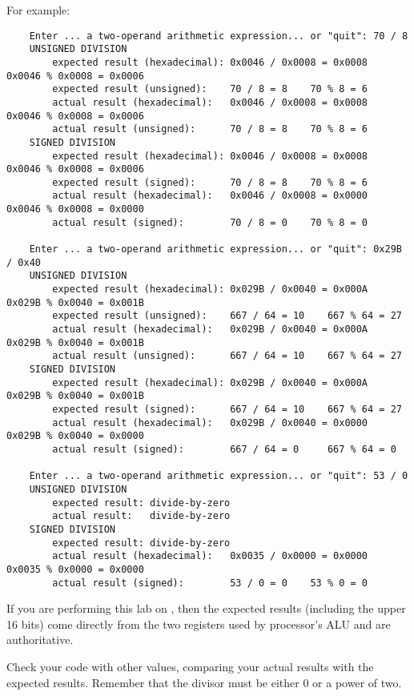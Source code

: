 For example:
\begin{small}\begin{verbatim}
    Enter ... a two-operand arithmetic expression... or "quit": 70 / 8
    UNSIGNED DIVISION
        expected result (hexadecimal): 0x0046 / 0x0008 = 0x0008    0x0046 % 0x0008 = 0x0006
        expected result (unsigned):    70 / 8 = 8    70 % 8 = 6
        actual result (hexadecimal):   0x0046 / 0x0008 = 0x0008    0x0046 % 0x0008 = 0x0006
        actual result (unsigned):      70 / 8 = 8    70 % 8 = 6
    SIGNED DIVISION
        expected result (hexadecimal): 0x0046 / 0x0008 = 0x0008    0x0046 % 0x0008 = 0x0006
        expected result (signed):      70 / 8 = 8    70 % 8 = 6
        actual result (hexadecimal):   0x0046 / 0x0008 = 0x0000    0x0046 % 0x0008 = 0x0000
        actual result (signed):        70 / 8 = 0    70 % 8 = 0

    Enter ... a two-operand arithmetic expression... or "quit": 0x29B / 0x40
    UNSIGNED DIVISION
        expected result (hexadecimal): 0x029B / 0x0040 = 0x000A    0x029B % 0x0040 = 0x001B
        expected result (unsigned):    667 / 64 = 10    667 % 64 = 27
        actual result (hexadecimal):   0x029B / 0x0040 = 0x000A    0x029B % 0x0040 = 0x001B
        actual result (unsigned):      667 / 64 = 10    667 % 64 = 27
    SIGNED DIVISION
        expected result (hexadecimal): 0x029B / 0x0040 = 0x000A    0x029B % 0x0040 = 0x001B
        expected result (signed):      667 / 64 = 10    667 % 64 = 27
        actual result (hexadecimal):   0x029B / 0x0040 = 0x0000    0x029B % 0x0040 = 0x0000
        actual result (signed):        667 / 64 = 0     667 % 64 = 0

    Enter ... a two-operand arithmetic expression... or "quit": 53 / 0
    UNSIGNED DIVISION
        expected result: divide-by-zero
        actual result:   divide-by-zero
    SIGNED DIVISION
        expected result: divide-by-zero
        actual result (hexadecimal):   0x0035 / 0x0000 = 0x0000    0x0035 % 0x0000 = 0x0000
        actual result (signed):        53 / 0 = 0    53 % 0 = 0
\end{verbatim}\end{small}

If you are performing this lab on \runtimeenvironment, then the expected results (including the upper 16 bits) come directly from the two registers used by processor's ALU and are authoritative.

Check your code with other values, comparing your actual results with the expected results.
Remember that the divisor must be either 0 or a power of two.
